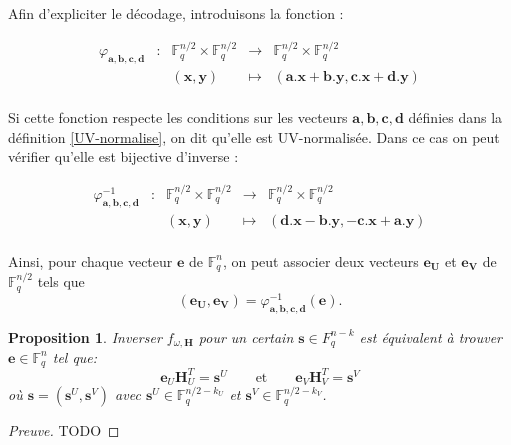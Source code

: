 \documentclass[12pt]{article}
\theoremstyle{plain}
\newtheorem{propo}[thm]{Proposition}
\newcommand{\F}{\mathbb{F}}
\begin{document}
Afin d'expliciter le décodage, introduisons la fonction :

$$\begin{array}{ccccc}
\varphi_{\mathbf{a},\mathbf{b},\mathbf{c},\mathbf{d}} & : & \F_q^{n/2} \times  \F_q^{n/2} & \to & \F_q^{n/2} \times  \F_q^{n/2} \\
 & & (\mathbf{x} , \mathbf{y}) & \mapsto &  (\mathbf{a}.\mathbf{x} + \mathbf{b}.\mathbf{y}, \mathbf{c}.\mathbf{x} + \mathbf{d}.\mathbf{y}) \\
\end{array}$$

Si cette fonction respecte les conditions sur les vecteurs $\mathbf{a},\mathbf{b},\mathbf{c},\mathbf{d}$ définies dans la définition \ref{UV-normalise}, on dit qu'elle est UV-normalisée. Dans ce cas on peut vérifier qu'elle est bijective d'inverse :

$$\begin{array}{ccccc}
\varphi^{-1}_{\mathbf{a},\mathbf{b},\mathbf{c},\mathbf{d}} & : & \F_q^{n/2} \times  \F_q^{n/2} & \to & \F_q^{n/2} \times  \F_q^{n/2} \\
 & & (\mathbf{x} , \mathbf{y}) & \mapsto &  (\mathbf{d}.\mathbf{x} - \mathbf{b}.\mathbf{y}, -\mathbf{c}.\mathbf{x} + \mathbf{a}.\mathbf{y}) \\
\end{array}$$

Ainsi, pour chaque vecteur $\mathbf{e}$ de $\F_q^n$, on peut associer deux vecteurs $\mathbf{e_U}$ et $\mathbf{e_V}$ de $\F_q^{n/2}$ tels que 
$$ (\mathbf{e_U},\mathbf{e_V}) = \varphi^{-1}_{\mathbf{a},\mathbf{b},\mathbf{c},\mathbf{d}}(\mathbf{e}).$$

\begin{propo} Inverser $f_{\omega,\mathbf{H}}$ pour un certain $\mathbf{s} \in F_q^{n-k}$ est équivalent à trouver $\mathbf{e} \in \F_q^n$ tel que:
$$ \mathbf{e}_U\mathbf{H}_U^T = \mathbf{s}^U \qquad \text{et} \qquad \mathbf{e}_V\mathbf{H}_V^T = \mathbf{s}^V $$
où $\mathbf{s} = (\mathbf{s}^U, \mathbf{s}^V)$ avec $\mathbf{s}^U \in \F_q^{n/2-k_U}$ et $\mathbf{s}^V \in \F_q^{n/2-k_V}$.
\end{propo}

\begin{proof}[Preuve] TODO
\end{proof}
\end{document}
